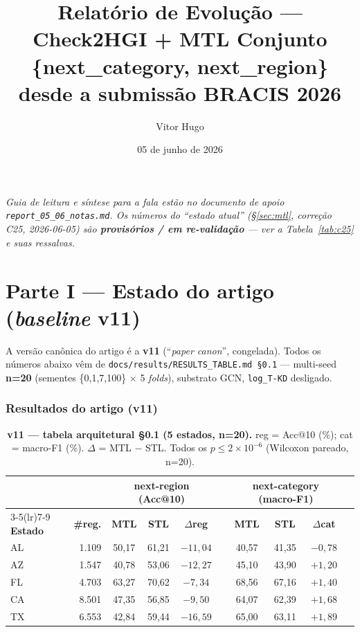 \documentclass[11pt,a4paper]{article}
\title{\textbf{Relatório de Evolução --- Check2HGI + MTL Conjunto\\
\large \{next\_category, next\_region\} desde a submissão BRACIS 2026}}
\author{Vitor Hugo}
\date{05 de junho de 2026}
\newcommand{\good}[1]{\textcolor{green!45!black}{\textbf{#1}}}
\newcommand{\bad}[1]{\textcolor{red!60!black}{\textbf{#1}}}
\begin{document}
\maketitle

\noindent\footnotesize\textit{Guia de leitura e síntese para a fala estão no documento de apoio
\texttt{report\_05\_06\_notas.md}. Os números do ``estado atual'' (\S\ref{sec:mtl}, correção C25,
2026-06-05) são \textbf{provisórios / em re-validação} --- ver a Tabela~\ref{tab:c25} e suas ressalvas.}
\normalsize
\bigskip

\part*{Parte I --- Estado do artigo (\textit{baseline} v11)}

A versão canônica do artigo é a \textbf{v11} (``\textit{paper canon}'', congelada). Todos os números
abaixo vêm de \texttt{docs/results/RESULTS\_TABLE.md \S0.1} --- multi-seed \textbf{n=20}
(sementes \{0,1,7,100\} $\times$ 5 \textit{folds}), substrato GCN, \texttt{log\_T-KD} desligado.

\section{Resultados do artigo (v11)}\label{sec:v11}

\begin{table}[H]
\centering
\footnotesize
\caption{\textbf{v11 --- tabela arquitetural \S0.1 (5 estados, n=20).} reg = Acc@10 (\%); cat =
macro-F1 (\%). $\Delta$ = MTL $-$ STL. Todos os $p \le 2\!\times\!10^{-6}$ (Wilcoxon pareado, n=20).}
\renewcommand{\arraystretch}{1.15}
\begin{tabular}{lr cc c c cc c c}
\toprule
 & & \multicolumn{3}{c}{\textbf{next-region (Acc@10)}} & & \multicolumn{3}{c}{\textbf{next-category (macro-F1)}} \\
\cmidrule(lr){3-5}\cmidrule(lr){7-9}
\textbf{Estado} & \textbf{\#reg.} & \textbf{MTL} & \textbf{STL} & \textbf{$\Delta$reg} & & \textbf{MTL} & \textbf{STL} & \textbf{$\Delta$cat} \\
\midrule
AL & 1.109 & 50,17 & 61,21 & \bad{$-11,04$} & & 40,57 & 41,35 & \bad{$-0,78$} \\
AZ & 1.547 & 40,78 & 53,06 & \bad{$-12,27$} & & 45,10 & 43,90 & \good{$+1,20$} \\
FL & 4.703 & 63,27 & 70,62 & \bad{$-7,34$}  & & 68,56 & 67,16 & \good{$+1,40$} \\
CA & 8.501 & 47,35 & 56,85 & \bad{$-9,50$}  & & 64,07 & 62,39 & \good{$+1,68$} \\
TX & 6.553 & 42,84 & 59,44 & \bad{$-16,59$} & & 65,00 & 63,11 & \good{$+1,89$} \\
\bottomrule
\end{tabular}
\end{table}
\end{document}
